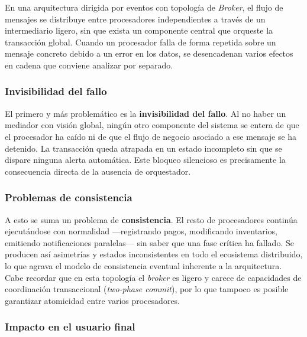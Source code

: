 
En una arquitectura dirigida por eventos con topología de \emph{Broker}, el flujo de
mensajes se distribuye entre procesadores independientes a través de un intermediario
ligero, sin que exista un componente central que orqueste la transacción global.
Cuando un procesador falla de forma repetida sobre un mensaje concreto debido a un
error en los datos, se desencadenan varios efectos en cadena que conviene analizar
por separado.

\subsubsection{Invisibilidad del fallo}

El primero y más problemático es la \textbf{invisibilidad del fallo}. Al no haber un
mediador con visión global, ningún otro componente del sistema se entera de que el
procesador ha caído ni de que el flujo de negocio asociado a ese mensaje se ha
detenido. La transacción queda atrapada en un estado incompleto sin que se dispare
ninguna alerta automática. Este bloqueo silencioso es precisamente la consecuencia
directa de la ausencia de orquestador.

\subsubsection{Problemas de consistencia}

A esto se suma un problema de \textbf{consistencia}. El resto de procesadores
continúa ejecutándose con normalidad ---registrando pagos, modificando inventarios,
emitiendo notificaciones paralelas--- sin saber que una fase crítica ha fallado. Se
producen así asimetrías y estados inconsistentes en todo el ecosistema distribuido,
lo que agrava el modelo de consistencia eventual inherente a la arquitectura. Cabe
recordar que en esta topología el \emph{broker} es ligero y carece de capacidades de
coordinación transaccional (\emph{two-phase commit}), por lo que tampoco es posible
garantizar atomicidad entre varios procesadores.

\subsubsection{Impacto en el usuario final}

